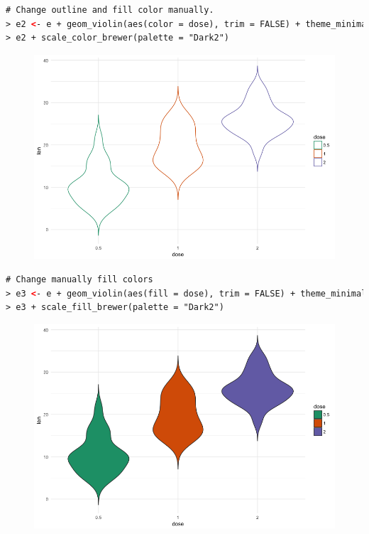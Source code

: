 \begin{lstlisting}[language=html]
# Change outline and fill color manually.
> e2 <- e + geom_violin(aes(color = dose), trim = FALSE) + theme_minimal()
> e2 + scale_color_brewer(palette = "Dark2")
\end{lstlisting}
\begin{figure}[H]\begin{center}\includegraphics[scale=1 ]{ilu/bg97.png}\end{center}\end{figure}
\begin{lstlisting}[language=html]
# Change manually fill colors
> e3 <- e + geom_violin(aes(fill = dose), trim = FALSE) + theme_minimal()
> e3 + scale_fill_brewer(palette = "Dark2")
\end{lstlisting}
\begin{figure}[H]\begin{center}\includegraphics[scale=1 ]{ilu/bg98.png}\end{center}\end{figure}

